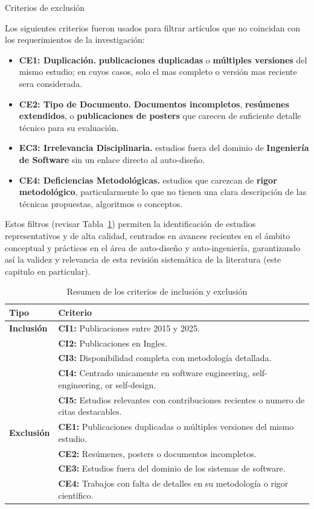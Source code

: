 \documentclass[12pt, letterpaper, oneside]{book}
\begin{document}
Criterios de exclusión

Los siguientes criterios fueron usados para filtrar artículos que no coincidan con los requerimientos de la investigación:

\begin{itemize}
	\item \textbf{CE1: Duplicación.} \textbf{publicaciones duplicadas} o \textbf{múltiples versiones} del mismo estudio; en cuyos casos, solo el mas completo o versión mas reciente sera considerada.
	\item \textbf{CE2: Tipo de Documento.} \textbf{Documentos incompletos}, \textbf{resúmenes extendidos}, o \textbf{publicaciones de posters} que carecen de suficiente detalle técnico para su evaluación.
	\item \textbf{EC3: Irrelevancia Disciplinaria.} estudios fuera del dominio de \textbf{Ingeniería de Software} sin un enlace directo al auto-diseño.
	\item \textbf{CE4: Deficiencias Metodológicas.} estudios que carezcan de \textbf{rigor metodológico}, particularmente lo que no tienen una clara descripción de las técnicas propuestas, algoritmos o conceptos.
\end{itemize}


Estos filtros (revisar Tabla~\ref{tab:criterios}) permiten la identificación de estudios representativos y de alta calidad, centrados en avances recientes en el ámbito conceptual y prácticos en el área de auto-diseño y auto-ingeniería, garantizando así la validez y relevancia de esta revisión sistemática de la literatura (este capitulo en particular).

\vspace{0.5cm}

\begin{table}[H]
	\centering
	\caption{Resumen de los criterios de inclusión y exclusión}
	\label{tab:criterios}
	\begin{tabular}{p{} p{}}
		\toprule
		\textbf{Tipo} & \textbf{Criterio} \\
		\midrule
		\textbf{Inclusión} & \textbf{CI1:} Publicaciones entre 2015 y 2025. \\
		& \textbf{CI2:} Publicaciones en Ingles. \\
		& \textbf{CI3:} Disponibilidad completa con metodología detallada.\\
		& \textbf{CI4:} Centrado unicamente en software engineering, self-engineering, or self-design. \\
		& \textbf{CI5:} Estudios relevantes con contribuciones recientes o numero de citas destacables. \\[0.2cm]
		\textbf{Exclusión} & \textbf{CE1:} Publicaciones duplicadas o múltiples versiones del mismo estudio. \\
		& \textbf{CE2:} Resúmenes, posters o documentos incompletos.\\
		& \textbf{CE3:} Estudios fuera del dominio de los sistemas de software.\\
		& \textbf{CE4:} Trabajos con falta de detalles en su metodología o rigor científico.\\
		\bottomrule
	\end{tabular}
\end{table}
\end{document}
